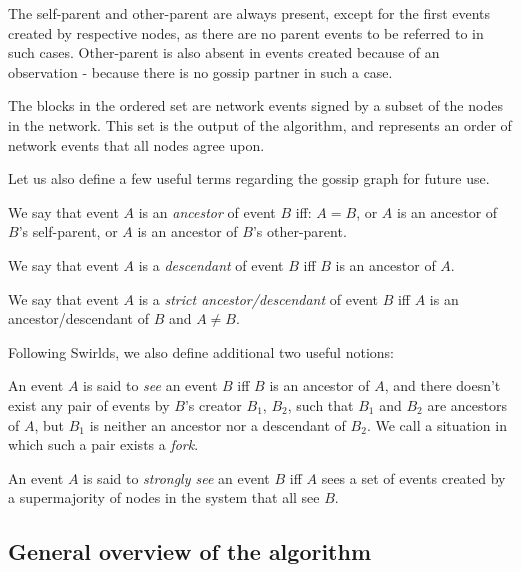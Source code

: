 \documentclass[a4paper,fleqn]{article}
\begin{document}
The self-parent and other-parent are always present, except for the first events created by
respective nodes, as there are no parent events to be referred to in such cases. Other-parent is
also absent in events created because of an observation - because there is no gossip partner in
such a case.

The blocks in the ordered set are network events signed by a subset of the nodes in the network.
This set is the output of the algorithm, and represents an order of network events that all nodes
agree upon.

Let us also define a few useful terms regarding the gossip graph for future use.

\begin{defn}
	We say that event $A$ is an \emph{ancestor} of event $B$ iff: $A = B$, or $A$ is an ancestor of
	$B$'s self-parent, or $A$ is an ancestor of $B$'s other-parent.
\end{defn}

\begin{defn}
	We say that event $A$ is a \emph{descendant} of event $B$ iff $B$ is an ancestor of $A$.
\end{defn}

\begin{defn}
	We say that event $A$ is a \emph{strict ancestor/descendant} of event $B$ iff $A$ is an
	ancestor/descendant of $B$ and $A \neq B$.
\end{defn}

Following Swirlds\cite{hg}, we also define additional two useful notions:

\begin{defn}
	An event $A$ is said to \emph{see} an event $B$ iff $B$ is an ancestor of $A$, and there
	doesn't exist any pair of events by $B$'s creator $B_1$, $B_2$, such that $B_1$ and $B_2$ are
	ancestors of $A$, but $B_1$ is neither an ancestor nor a descendant of $B_2$. We call a
	situation in which such a pair exists a \emph{fork}.
\end{defn}

\begin{defn}
	An event $A$ is said to \emph{strongly see} an event $B$ iff $A$ sees a set of events created
	by a supermajority of nodes in the system that all see $B$.
\end{defn}

\subsection{General overview of the algorithm}
\end{document}
